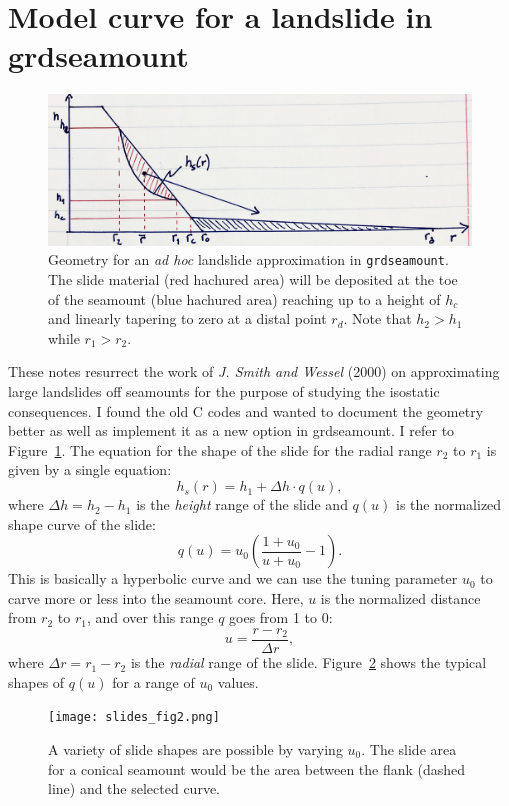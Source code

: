 \documentclass[12pt,letterpaper,margin=0.5in]{report}
\begin{document}
\section{Model curve for a landslide in grdseamount}

\begin{figure}[h!]
  \centering
  \includegraphics[width=5in]{slides_fig1.png}
  \caption{Geometry for an \emph{ad hoc} landslide approximation in \texttt{grdseamount}.  The slide material (red hachured area)
  will be deposited at the toe of the seamount (blue hachured area) reaching up to a height of $h_c$ and linearly
  tapering to zero at a distal point $r_d$. Note that $h_2 > h_1$ while $r_1 > r_2$.}
  \label{slides_fig1}
\end{figure}

These notes resurrect the work of {\it J. Smith and Wessel} (2000) on approximating large landslides off seamounts
for the purpose of studying the isostatic consequences.  I found the old C codes and wanted to document the geometry
better as well as implement it as a new option in grdseamount.  I refer to Figure~\ref{slides_fig1}.  The equation for the
shape of the slide for the radial range $r_2$ to $r_1$ is given by a single equation:
\begin{equation}
h_s(r) = h_1 + \Delta h \cdot q(u),
\end{equation}
where $\Delta h = h_2 - h_1$ is the \emph{height} range of the slide and $q(u)$ is the normalized shape curve of the slide:
\begin{equation}
q(u) = u_0 \left (\frac{1 + u_0}{u + u_0} - 1 \right ).
\end{equation}
This is basically a hyperbolic curve and we can use the tuning parameter $u_0$ to carve more or less into the seamount core.
Here, $u$ is the normalized distance from $r_2$ to $r_1$, and over this range $q$ goes from 1 to 0:
\begin{equation}
u = \frac{r-r_2}{\Delta r},
\end{equation}
where $\Delta r = r_1 - r_2$ is the \emph{radial} range of the slide.
Figure~\ref{slides_fig2} shows the typical shapes of $q(u)$ for a range of $u_0$ values.
\begin{figure}[h!]
  \centering
  \texttt{[image: slides\_fig2.png]}
  \caption{A variety of slide shapes are possible by varying $u_0$.  The slide area for a conical seamount would be the area
  between the flank (dashed line) and the selected curve.}
  \label{slides_fig2}
\end{figure}
\end{document}
